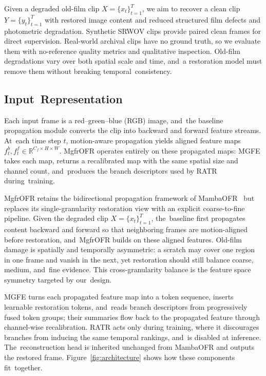 \documentclass[symmetry,article,accept,pdftex,moreauthors]{Definitions/mdpi}
\begin{document}
Given a degraded old-film clip $X=\{x_t\}_{t=1}^{T}$, we aim to recover a clean clip $Y=\{y_t\}_{t=1}^{T}$ with restored image content and reduced structured film defects and photometric degradation. Synthetic SRWOV clips provide paired clean frames for direct supervision. Real-world archival clips have no ground truth, so we evaluate them with no-reference quality metrics and qualitative inspection. Old-film degradations vary over both spatial scale and time, and~a restoration model must remove them without breaking temporal~consistency.

\subsection{Input~Representation}
\label{subsec:input_representation}

Each input frame is a red--green--blue (RGB) image, and~the baseline propagation module converts the clip into backward and forward feature streams. At~each time step $t$, motion-aware propagation yields aligned feature maps $f_t^{b}, f_t^{f} \in \mathbb{R}^{C_f \times H \times W}$. MgfrOFR operates entirely on these propagated maps: MGFE takes each map, returns a recalibrated map with the same spatial size and channel count, and~produces the branch descriptors used by RATR during~training.

MgfrOFR retains the bidirectional propagation framework of MambaOFR~\cite{mao2025mambaofr} but replaces its single-granularity restoration view with an explicit coarse-to-fine pipeline. Given the degraded clip $X=\{x_t\}_{t=1}^{T}$, the~baseline first propagates content backward and forward so that neighboring frames are motion-aligned before restoration, and~MgfrOFR builds on these aligned features. Old-film damage is spatially and temporally asymmetric: a scratch may cover one region in one frame and vanish in the next, yet restoration should still balance coarse, medium, and~fine evidence. This cross-granularity balance is the feature space symmetry targeted by our~design.

MGFE turns each propagated feature map into a token sequence, inserts learnable restoration tokens, and~reads branch descriptors from progressively fused token groups; their summaries flow back to the propagated feature through channel-wise recalibration. RATR acts only during training, where it discourages branches from inducing the same temporal rankings, and~is disabled at inference. The~reconstruction head is inherited unchanged from MambaOFR and outputs the restored frame. Figure~\ref{fig:architecture} shows how these components fit~together.
\end{document}
